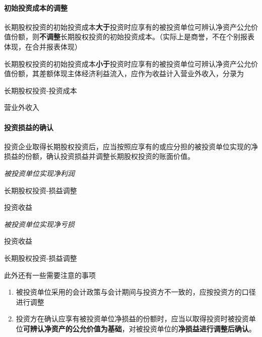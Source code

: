 \documentclass[UTF8,12pt]{ctexart}
\newenvironment{Dr}{%
	\begin{list}{}%
		{
			\setlength{\leftmargin}{2em}
			\setlength{\labelwidth}{2em}
			\setlength{\labelsep}{0pt}
			\setlength{\itemindent}{0pt}
			\setlength{\listparindent}{0pt}
			\setlength{\parsep}{0pt}
			\setlength{\topsep}{0pt}
		}
		\item[\textbf{借：}]
	}{%
	\end{list}
}
\newenvironment{Cr}{%
	\begin{list}{}%
		{
			\setlength{\leftmargin}{2em}
			\setlength{\labelwidth}{2em}
			\setlength{\labelsep}{0pt}
			\setlength{\itemindent}{0pt}
			\setlength{\listparindent}{0pt}
			\setlength{\parsep}{0pt}
			\setlength{\topsep}{0pt}
		}
		\item[\textbf{贷：}]
	}{%
	\end{list}
}
\numberwithin{equation}{section} %
\numberwithin{figure}{section}
\numberwithin{table}{section}
\begin{document}
	
	
	
	\paragraph{初始投资成本的调整}
	长期股权投资的初始投资成本\textbf{大于}投资时应享有的被投资单位可辨认净资产公允价值份额，则\textbf{不调整}长期股权投资的初始投资成本。（实际上是商誉，不在个别报表体现，在合并报表体现）
	
	长期股权投资的初始投资成本\textbf{小于}投资时应享有的被投资单位可辨认净资产公允价值份额，其差额体现主体经济利益流入，应作为收益计入营业外收入，分录为
	
	\begin{Dr}
		长期股权投资-投资成本
	\end{Dr}
	\begin{Cr}
		营业外收入
	\end{Cr}
	
	
	
	\paragraph{投资损益的确认}
	投资企业取得长期股权投资后，应当按照应享有的或应分担的被投资单位实现的净损益的份额，确认投资损益并调整长期股权投资的账面价值。
	
	\textit{被投资单位实现净利润}
	
	\begin{Dr}
		长期股权投资-损益调整
	\end{Dr}
	\begin{Cr}
		投资收益
	\end{Cr}
	
	\textit{被投资单位实现净亏损}
	
	\begin{Dr}
		投资收益
	\end{Dr}
	\begin{Cr}
		长期股权投资-损益调整
	\end{Cr}
	
	此外还有一些需要注意的事项
	\begin{enumerate}
		\item 被投资单位采用的会计政策与会计期间与投资方不一致的，应按投资方的口径进行调整
		
		\item 投资方在确认应享有被投资单位净损益的份额时，应当以取得投资时被投资单位\textbf{可辨认净资产的公允价值为基础}，对被投资单位的\textbf{净损益进行调整后确认}。
	\end{enumerate}
	
\end{document}
